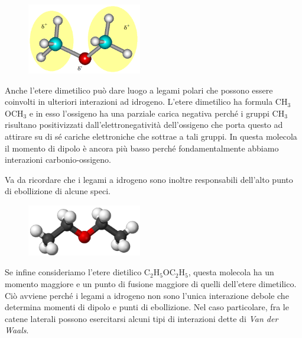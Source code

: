 \hspace{0.5cm}\begin{minipage}{0.35 \textwidth}
    \begin{figure}[H]
        \includegraphics[width=5cm]{immagini/etere_dimetilico.png}
    \end{figure}
\end{minipage}
\begin{minipage}{0.6 \textwidth}
    \vspace{0.6cm}Anche l'etere dimetilico può dare luogo a legami polari che possono essere coinvolti in ulteriori interazioni ad idrogeno. L'etere dimetilico ha formula CH$_3$OCH$_3$ e in esso l'ossigeno ha una parziale carica negativa perché i gruppi CH$_3$ risultano positivizzati dall'elettronegatività dell'ossigeno che porta questo ad attirare su di sé cariche elettroniche che sottrae a tali gruppi. In questa molecola il momento di dipolo è ancora più basso perché fondamentalmente abbiamo interazioni carbonio-ossigeno.
\end{minipage}

\vspace{0.2cm}Va da ricordare che i legami a idrogeno sono inoltre responsabili dell'alto punto di ebollizione di alcune speci.

\hspace{0.5cm}\begin{minipage}{0.35 \textwidth}
    \begin{figure}[H]
        \includegraphics[width=5cm]{immagini/etere_dietilico.png}
    \end{figure}
\end{minipage}
\begin{minipage}{0.6 \textwidth}
    \vspace{0.6cm}Se infine consideriamo l'etere dietilico C$_2$H$_5$OC$_2$H$_5$, questa molecola ha un momento maggiore e un punto di fusione maggiore di quelli dell'etere dimetilico. Ciò avviene perché i legami a idrogeno non sono l'unica interazione debole che determina momenti di dipolo e punti di ebollizione. Nel caso particolare, fra le catene laterali possono esercitarsi alcuni tipi di interazioni dette di \textit{Van der Waals}.
\end{minipage}

